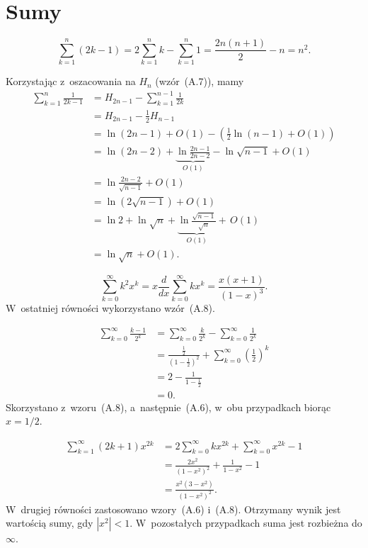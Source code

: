 \chapter{Sumy}


\exercise %
\[
	\sum_{k=1}^n(2k-1) = 2\sum_{k=1}^nk-\sum_{k=1}^n1 = \frac{2n(n+1)}{2}-n = n^2.
\]

\exercise %
Korzystając z~oszacowania na $H_n$ (wzór~(A.7)), mamy
\begin{align*}
	\sum_{k=1}^n\frac{1}{2k-1} &= H_{2n-1}-\sum_{k=1}^{n-1}\frac{1}{2k} \\
	&= H_{2n-1}-\frac{1}{2}H_{n-1} \\
	&= \ln (2n-1)+O(1)-\left(\frac{1}{2}\ln(n-1)+O(1)\right) \\
	&= \ln (2n-2)+\underbrace{\ln\frac{2n-1}{2n-2}}_{O(1)}-\ln\sqrt{n-1}+O(1) \\
	&= \ln\frac{2n-2}{\sqrt{n-1}}+O(1) \\[1mm]
	&= \ln\left(2\sqrt{n-1}\right)+O(1) \\
	&= \ln 2+\ln\sqrt{n}+\underbrace{\ln\frac{\sqrt{n-1}}{\sqrt{n}}}_{O(1)}+\,O(1) \\
	&= \ln\sqrt{n}+O(1).
\end{align*}

\exercise %
\[
	\sum_{k=0}^\infty k^2x^k = x\frac{d}{dx}\sum_{k=0}^\infty kx^k = \frac{x(x+1)}{(1-x)^3}.
\]
W~ostatniej równości wykorzystano wzór~(A.8).

\exercise %
\begin{align*}
	\sum_{k=0}^\infty\frac{k-1}{2^k} &= \sum_{k=0}^\infty\frac{k}{2^k}-\sum_{k=0}^\infty\frac{1}{2^k} \\
	&= \frac{\frac{1}{2}}{\left(1-\frac{1}{2}\right)^2}+\sum_{k=0}^\infty\left(\frac{1}{2}\right)^k \\
	&= 2-\frac{1}{1-\frac{1}{2}} \\
	&= 0.
\end{align*}
Skorzystano z~wzoru~(A.8), a~następnie~(A.6), w~obu przypadkach biorąc $x=1/2$.

\exercise %
\begin{align*}
	\sum_{k=1}^\infty(2k+1)x^{2k} &= 2\sum_{k=0}^\infty kx^{2k}+\sum_{k=0}^\infty x^{2k}-1 \\
	&= \frac{2x^2}{(1-x^2)^2}+\frac{1}{1-x^2}-1 \\[1mm]
	&= \frac{x^2(3-x^2)}{(1-x^2)^2}.
\end{align*}
W~drugiej równości zastosowano wzory~(A.6) i~(A.8). Otrzymany wynik jest wartością sumy, gdy $|x^2|<1$. W~pozostałych przypadkach suma jest rozbieżna do $\infty$.

